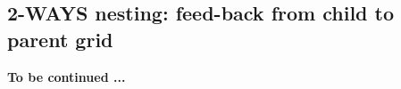 \subsection{2-WAYS nesting:  feed-back from child to parent grid}
\label{sec:2-ways-nesting}
\textbf{To be continued ...}



